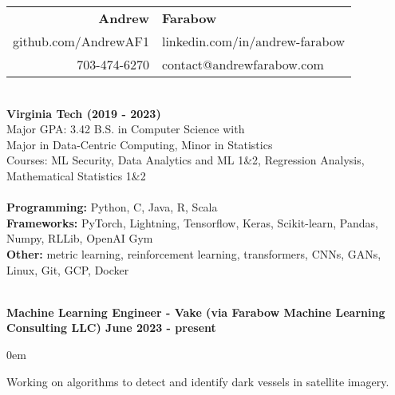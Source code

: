\documentclass{article}
\begin{document}
\begin{center}
  \begin{tabular}{r l}
    {\huge\textbf{Andrew}}             & {\huge\textbf{Farabow}}        \\
    \hspace{35pt} github.com/AndrewAF1 & linkedin.com/in/andrew-farabow \\
    703-474-6270                       & contact@andrewfarabow.com      \\
  \end{tabular}


  \begin{flushleft}
    \begin{multicols}{2}
      {\large\textbf{\underline{}}} \\
      \textbf{Virginia Tech (2019 - 2023)} \\
      Major GPA: 3.42 \; B.S. in Computer Science with \\
      Major in Data-Centric Computing, Minor in Statistics \\
      Courses: ML Security, Data Analytics and ML 1\&2, Regression Analysis, Mathematical Statistics 1\&2 \\


      \columnbreak
      {\large\textbf{\underline{}}} \\
      {\textbf{Programming:}} Python, C, Java, R, Scala \\
      {\textbf{Frameworks:}} PyTorch, Lightning, Tensorflow, Keras, Scikit-learn, Pandas, Numpy, RLLib, OpenAI Gym \\
      {\textbf{Other:}} metric learning, reinforcement learning, transformers, CNNs, GANs, Linux, Git, GCP, Docker \\ %

    \end{multicols}

    {\large\textbf{\underline{}}} \\

    \textbf{Machine Learning Engineer - Vake (via Farabow Machine Learning Consulting LLC) \hfill June 2023 - present}
    \begin{compactitem}
      \itemsep0em
      \item Working on algorithms to detect and identify dark vessels in satellite imagery.
    \end{compactitem}


\end{flushleft}
\end{center}
\end{document}
